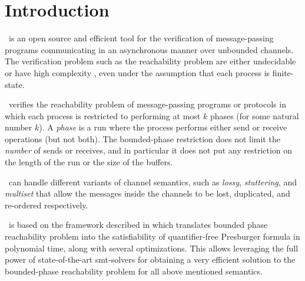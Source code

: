\section{Introduction}

\MPass\ is an open source and  efficient tool for the verification of message-passing programs 
communicating in an asynchronous manner over unbounded  channels.
 The verification problem  such as the reachability problem are either undecidable  \cite{BZ83} or have high complexity  \cite{AB93,Rack78,phs-IPL2002,lipton}, even under the assumption that each process is finite-state. 


%
\MPass\ verifies the reachability problem of message-passing programs or protocols in which each process is restricted to performing at most $k$ phases (for some natural number $k$).
A {\it phase}  is a run where the process performs  either send or receive operations
(but not both). The bounded-phase  restriction does not limit the \emph{number} of
sends or receives,  and in particular it does not put any restriction on the length of the
run or the size of the buffers.

%
%

\MPass\ can handle different variants of channel semantics, such as
{\it lossy}, {\it stuttering}, and {\it multiset} that
allow the messages inside the channels to be lost,
duplicated, and re-ordered respectively.



%
\MPass\ is based on the framework   described in \cite{AAC13} which translates bounded phase reachability problem  into the satisfiability of quantifier-free Presburger formula in polynomial time, along with several optimizations. This allows  leveraging the full power of state-of-the-art
{\sc smt}-solvers for obtaining a very efficient solution to the bounded-phase reachability problem for all above mentioned semantics. 


